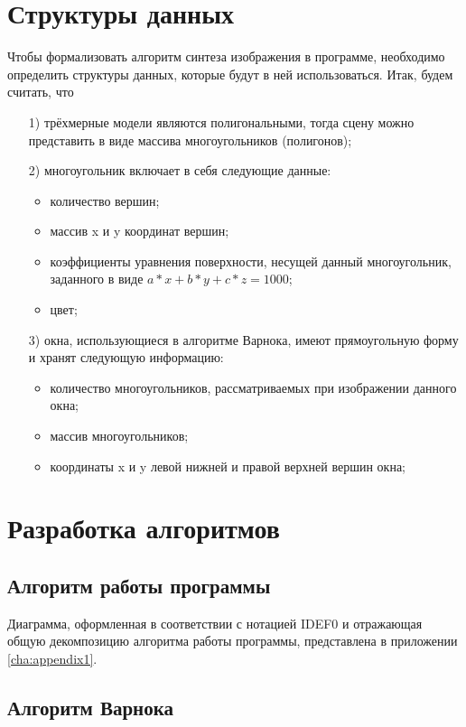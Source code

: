 \section{Структуры данных}
Чтобы формализовать алгоритм синтеза изображения в программе, необходимо определить структуры данных, которые будут в ней использоваться. Итак, будем считать, что
\begin{enumerate}
	\item[1)] трёхмерные модели являются полигональными, тогда сцену можно представить в виде массива многоугольников (полигонов);
	\item[2)] многоугольник включает в себя следующие данные:
	\begin{itemize}
		\item количество вершин;
		\item массив x и y координат вершин;
		\item коэффициенты уравнения поверхности, несущей данный многоугольник, заданного в виде $a*x + b*y + c*z = 1000$;
		\item цвет;
	\end{itemize}
	\item[3)] окна, использующиеся в алгоритме Варнока, имеют прямоугольную форму и хранят следующую информацию:
	\begin{itemize}
		\item количество многоугольников, рассматриваемых при изображении данного окна;
		\item массив многоугольников;
		\item координаты x и y левой нижней и правой верхней вершин окна;
	\end{itemize}
\end{enumerate}

\section{Разработка алгоритмов}
\subsection{Алгоритм работы программы}
Диаграмма, оформленная в соответствии с нотацией IDEF0 и отражающая общую декомпозицию алгоритма работы программы, представлена в приложении \ref{cha:appendix1}.


\subsection{Алгоритм Варнока}

